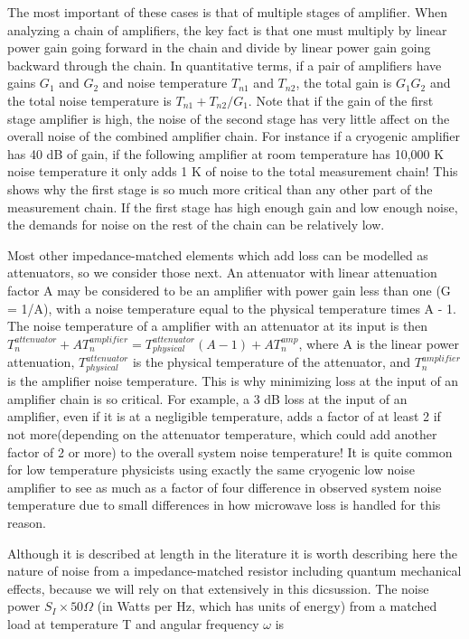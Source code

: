 \documentclass[11pt]{article}
\begin{document}
    	The most important of these cases is that of multiple stages of amplifier.  When analyzing a chain of amplifiers, the key fact is that one must multiply by linear power gain going forward in the chain and divide by linear power gain going backward through the chain.  In quantitative terms, if a pair of amplifiers have gains $G_1$ and $G_2$ and noise temperature $T_{n1}$ and $T_{n2}$, the total gain is $G_1G_2$ and the total noise temperature is $T_{n1} + T_{n2}/G_1$.  Note that if the gain of the first stage amplifier is high, the noise of the second stage has very little affect on the overall noise of the combined amplifier chain.  For instance if a cryogenic amplifier has 40 dB of gain, if the following amplifier at room temperature has 10,000 K noise temperature it only adds 1 K of noise to the total measurement chain!  This shows why the first stage is so much more critical than any other part of the measurement chain.  If the first stage has high enough gain and low enough noise, the demands for noise on the rest of the chain can be relatively low.  





    	Most other impedance-matched elements which add loss can be modelled as attenuators, so we consider those next.  An attenuator with linear attenuation factor A may be considered to be an amplifier with power gain less than one (G = 1/A), with a noise temperature equal to the physical temperature times A - 1.  The noise temperature of a amplifier with an attenuator at its input is then $T^{attenuator}_n + AT^{amplifier}_{n} = T^{attenuator}_{physical}(A-1) + AT_n^{amp}$, where A is the linear power attenuation, $T^{attenuator}_{physical}$ is the physical temperature of the attenuator, and $T_n^{amplifier}$ is the amplifier noise temperature.  This is why minimizing loss at the input of an amplifier chain is so critical.  For example, a 3 dB loss at the input of an amplifier, even if it is at a negligible temperature, adds a factor of at least 2 if not more(depending on the attenuator temperature, which could add another factor of 2 or more) to the overall system noise temperature!  It is quite common for low temperature physicists using exactly the same cryogenic low noise amplifier to see as much as a factor of four difference in observed system noise temperature due to small differences in how microwave loss is handled for this reason.  




    	Although it is described at length in the literature it is worth describing here the nature of noise from a impedance-matched resistor including quantum mechanical effects, because we will rely on that extensively in this dicsussion.  The noise power $S_I\times 50 \Omega$ (in Watts per Hz, which has units of energy) from a matched load at temperature T and angular frequency $\omega$ is
	
\end{document}
